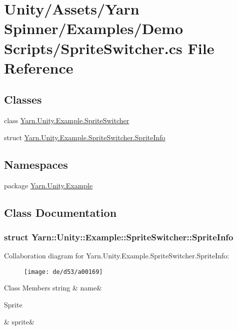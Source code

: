 \hypertarget{a00114}{\section{Unity/\-Assets/\-Yarn Spinner/\-Examples/\-Demo Scripts/\-Sprite\-Switcher.cs File Reference}
\label{a00114}
}
\subsection*{Classes}
\begin{DoxyCompactItemize}
\item 
class \hyperlink{a00073}{Yarn.\-Unity.\-Example.\-Sprite\-Switcher}
\item 
struct \hyperlink{a00073_d0/d48/a00165}{Yarn.\-Unity.\-Example.\-Sprite\-Switcher.\-Sprite\-Info}
\end{DoxyCompactItemize}
\subsection*{Namespaces}
\begin{DoxyCompactItemize}
\item 
package \hyperlink{a00155}{Yarn.\-Unity.\-Example}
\end{DoxyCompactItemize}


\subsection{Class Documentation}
\label{d0/d48/a00165}
\hypertarget{a00073_d0/d48/a00165}{}
\subsubsection{struct Yarn\-:\-:Unity\-:\-:Example\-:\-:Sprite\-Switcher\-:\-:Sprite\-Info}


Collaboration diagram for Yarn.\-Unity.\-Example.\-Sprite\-Switcher.\-Sprite\-Info\-:
\nopagebreak
\begin{figure}[H]
\begin{center}
\leavevmode
\texttt{[image: de/d53/a00169]}
\end{center}
\end{figure}
\begin{DoxyFields}{Class Members}
\hypertarget{a00073_a3f5bca2fff413dfe075c1fcf7e58369c}{string}\label{a00073_a3f5bca2fff413dfe075c1fcf7e58369c}
&
name&
\\
\hline

\hypertarget{a00073_adc58df011dc2841837b6cf775b372061}{Sprite}\label{a00073_adc58df011dc2841837b6cf775b372061}
&
sprite&
\\
\hline

\end{DoxyFields}
